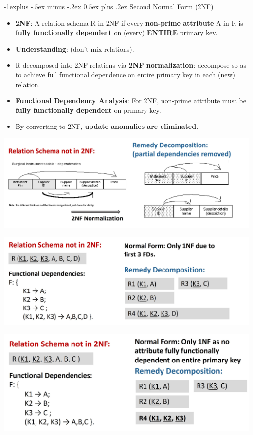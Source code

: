 \documentclass[12pt, landscape]{article}
\makeatletter
\renewcommand{\subsection}{\@startsection{subsection}{2}{0.1mm}%
                                {-1explus -.5ex minus -.2ex}%
                                {0.5ex plus .2ex}%
                                {\normalfont\normalsize\bfseries}}
\makeatother
\begin{document}
\begin{multicols*}{3}
\subsection{Second Normal Form (2NF)}
\begin{itemize}
\item \textbf{2NF}: A relation schema R in 2NF if every \textbf{non-prime attribute} A in R is \textbf{fully functionally dependent} on (every) \textbf{ENTIRE} primary key.
\item \textbf{Understanding}: (don't mix relations).
\item R decomposed into 2NF relations via \textbf{2NF normalization}: decompose so as to achieve full functional dependence on entire primary key in each (new) relation.
\item \textbf{Functional Dependency Analysis}: For 2NF, non-prime attribute must be \textbf{fully functionally dependent} on primary key.
\item By converting to 2NF, \textbf{update anomalies are eliminated}.
\end{itemize}
\medskip
\centerline{\includegraphics[width = 1\linewidth]{2NF}}
\medskip
\centerline{\includegraphics[width = 1\linewidth]{2NF-2}}
\medskip
\centerline{\includegraphics[width = 1\linewidth]{2NF-3}}

\end{multicols*}
\end{document}
